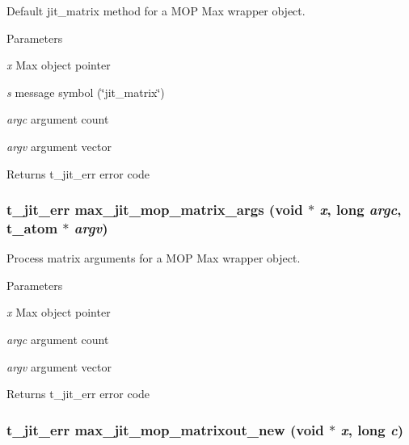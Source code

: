 Default jit\_\-matrix method for a MOP Max wrapper object. 
\begin{DoxyParams}{Parameters}
\item[{\em x}]Max object pointer \item[{\em s}]message symbol (\char`\"{}jit\_\-matrix\char`\"{}) \item[{\em argc}]argument count \item[{\em argv}]argument vector\end{DoxyParams}
\begin{DoxyReturn}{Returns}
t\_\-jit\_\-err error code 
\end{DoxyReturn}
\hypertarget{group__maxmopmod_ga75f7f306602775484eaa1b3f9d3998f3}{
\subsubsection[{max\_\-jit\_\-mop\_\-matrix\_\-args}]{\setlength{\rightskip}{0pt plus 5cm}t\_\-jit\_\-err max\_\-jit\_\-mop\_\-matrix\_\-args (void $\ast$ {\em x}, \/  long {\em argc}, \/  {\bf t\_\-atom} $\ast$ {\em argv})}}
\label{group__maxmopmod_ga75f7f306602775484eaa1b3f9d3998f3}


Process matrix arguments for a MOP Max wrapper object. 
\begin{DoxyParams}{Parameters}
\item[{\em x}]Max object pointer \item[{\em argc}]argument count \item[{\em argv}]argument vector\end{DoxyParams}
\begin{DoxyReturn}{Returns}
t\_\-jit\_\-err error code 
\end{DoxyReturn}
\hypertarget{group__maxmopmod_gade858d795f0afefa64a28acbb110f0a6}{
\subsubsection[{max\_\-jit\_\-mop\_\-matrixout\_\-new}]{\setlength{\rightskip}{0pt plus 5cm}t\_\-jit\_\-err max\_\-jit\_\-mop\_\-matrixout\_\-new (void $\ast$ {\em x}, \/  long {\em c})}}
\label{group__maxmopmod_gade858d795f0afefa64a28acbb110f0a6}


